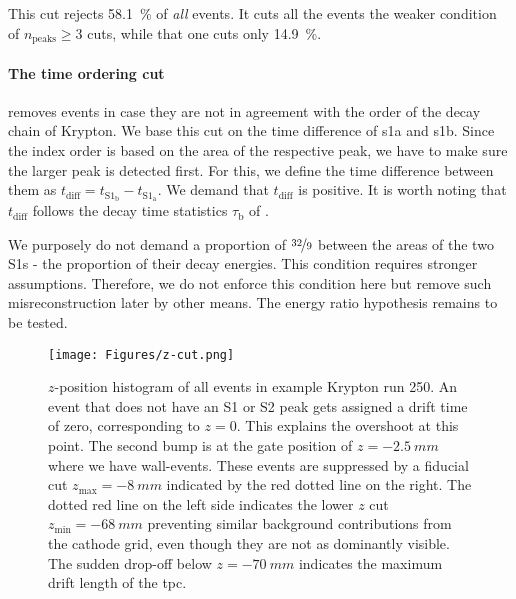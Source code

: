 This cut rejects \SI{58.1}{\%} of \emph{all} events. %
It cuts all the events the weaker condition of $ n_\mathrm{peaks} \ge 3 $ cuts, while that one cuts only \SI{14.9}{\%}.


\paragraph{The time ordering cut} removes events in case they are not in agreement with the order of the decay chain of Krypton.
We base this cut on the time difference of \gls{s1a} and \gls{s1b}.
Since the index order is based on the area of the respective peak, we have to make sure the larger peak is detected first.
For this, we define the time difference between them as $t_\mathrm{diff} = t_{\mathrm{S}1_\mathrm{b}} - t_{\mathrm{S}1_\mathrm{a}}$.
We demand that $t_\mathrm{diff}$ is positive.
It is worth noting that $t_\mathrm{diff}$ follows the decay time statistics $\tau_\mathrm{b}$ of . %

We purposely do not demand a proportion of $ \nicefrac{32}{9} $ between the areas of the two S1s - the proportion of their decay energies.
This condition requires stronger assumptions.
Therefore, we do not enforce this condition here but remove such misreconstruction later by other means.
The energy ratio hypothesis remains to be tested.

\begin{figure}[H]
    \centering
    \texttt{[image: Figures/z-cut.png]}  %
    \caption[Fiducial $ z $-cut]{
        $ z $-position histogram of all events in example Krypton run 250.
    An event that does not have an S1 or S2 peak gets assigned a drift time of zero, corresponding to $ z = 0 $.
    This explains the overshoot at this point.
    The second bump is at the gate position of $ z = \SI{-2.5}{mm}$ where we have wall-events.
    These events are suppressed by a fiducial cut $ z_\mathrm{max} = \SI{-8}{mm}$ indicated by the red dotted line on the right.
    The dotted red line on the left side indicates the lower $z$ cut $ z_\mathrm{min} = \SI{-68}{mm}$ preventing similar background contributions from the cathode grid,
    even though they are not as dominantly visible.
    The sudden drop-off below $ z = \SI{-70}{mm}$ indicates the maximum drift length of the \gls{tpc}.
    }
    \label{fig:fid-z-cut}
\end{figure}


